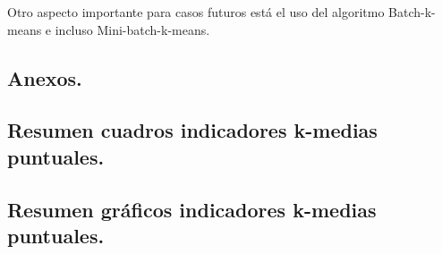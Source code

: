 \documentclass[]{article}
\newcommand{\blandscape}{\begin{landscape}}
\newcommand{\elandscape}{\end{landscape}}
\begin{document}
Otro aspecto importante para casos futuros está el uso del algoritmo
Batch-k-means e incluso Mini-batch-k-means.

\clearpage

\blandscape

\section*{Anexos.}\label{anexos.}

\subsection*{Resumen cuadros indicadores k-medias
puntuales.}\label{resumen-cuadros-indicadores-k-medias-puntuales.}



\elandscape

\blandscape



\elandscape

\blandscape



\elandscape

\blandscape



\elandscape

\blandscape



\elandscape

\blandscape



\elandscape

\blandscape



\elandscape

\subsection*{Resumen gráficos indicadores k-medias
puntuales.}\label{resumen-graficos-indicadores-k-medias-puntuales.}
\end{document}
